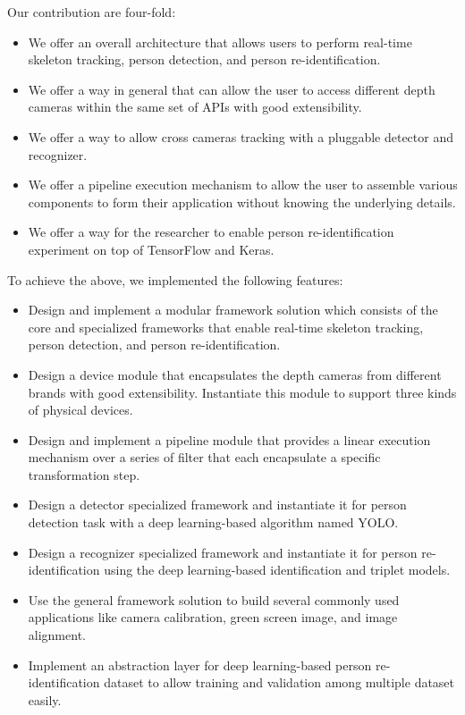 Our contribution are four-fold:

\begin{itemize}
    \item We offer an overall architecture that allows users to perform
    real-time skeleton tracking, person detection, and person
    re-identification.
    
    \item We offer a way in general that can allow the user to access
    different depth cameras within the same set of APIs with good extensibility.
    
    \item We offer a way to allow cross cameras tracking with a pluggable
    detector and recognizer.
    
    \item We offer a pipeline execution mechanism to allow the user to assemble 
    various components to form their application without knowing the underlying 
    details.
    
    \item We offer a way for the researcher to enable person re-identification
    experiment on top of TensorFlow and Keras.
\end{itemize}

\noindent To achieve the above, we implemented the following features:

\begin{itemize}
	\item Design and implement a modular framework solution which consists of
	the core and specialized frameworks that enable real-time skeleton 
	tracking, person detection, and person re-identification.

    \item Design a device module that encapsulates the depth cameras from
    different brands with good extensibility. Instantiate this module to
    support three kinds of physical devices.
    
    \item Design and implement a pipeline module that provides a linear
    execution mechanism over a series of filter that each encapsulate a 
    specific transformation step.

    \item Design a detector specialized framework and instantiate it for
    person detection task with a deep learning-based algorithm named YOLO.

    \item Design a recognizer specialized framework and instantiate it for
    person re-identification using the deep learning-based identification and
    triplet models.

    \item Use the general framework solution to build several commonly used
    applications like camera calibration, green screen image, and image
    alignment.

    \item Implement an abstraction layer for deep learning-based person
    re-identification dataset to allow training and validation among multiple
    dataset easily.
\end{itemize}

